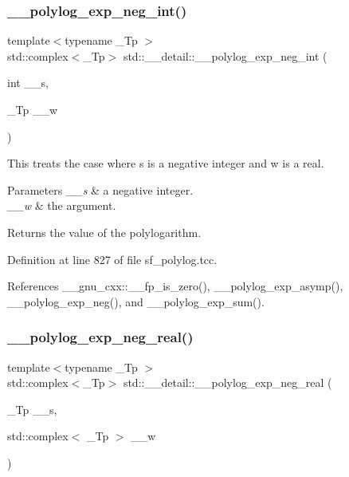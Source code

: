 \subsubsection{\texorpdfstring{\+\_\+\+\_\+polylog\+\_\+exp\+\_\+neg\+\_\+int()}{\_\_polylog\_exp\_neg\_int()}\hspace{0.1cm}{\footnotesize\ttfamily [2/2]}}
{\footnotesize\ttfamily template$<$typename \+\_\+\+Tp $>$ \\
std\+::complex$<$\+\_\+\+Tp$>$ std\+::\+\_\+\+\_\+detail\+::\+\_\+\+\_\+polylog\+\_\+exp\+\_\+neg\+\_\+int (\begin{DoxyParamCaption}\item[{int}]{\+\_\+\+\_\+s,  }\item[{\+\_\+\+Tp}]{\+\_\+\+\_\+w }\end{DoxyParamCaption})}

This treats the case where s is a negative integer and w is a real.


\begin{DoxyParams}{Parameters}
{\em \+\_\+\+\_\+s} & a negative integer. \\
\hline
{\em \+\_\+\+\_\+w} & the argument. \\
\hline
\end{DoxyParams}
\begin{DoxyReturn}{Returns}
the value of the polylogarithm. 
\end{DoxyReturn}


Definition at line 827 of file sf\+\_\+polylog.\+tcc.



References \+\_\+\+\_\+gnu\+\_\+cxx\+::\+\_\+\+\_\+fp\+\_\+is\+\_\+zero(), \+\_\+\+\_\+polylog\+\_\+exp\+\_\+asymp(), \+\_\+\+\_\+polylog\+\_\+exp\+\_\+neg(), and \+\_\+\+\_\+polylog\+\_\+exp\+\_\+sum().

\mbox{\label{namespacestd_1_1____detail_a6320926219e1a9a653d9a793c7a3ad37}} 
\subsubsection{\texorpdfstring{\+\_\+\+\_\+polylog\+\_\+exp\+\_\+neg\+\_\+real()}{\_\_polylog\_exp\_neg\_real()}\hspace{0.1cm}{\footnotesize\ttfamily [1/2]}}
{\footnotesize\ttfamily template$<$typename \+\_\+\+Tp $>$ \\
std\+::complex$<$\+\_\+\+Tp$>$ std\+::\+\_\+\+\_\+detail\+::\+\_\+\+\_\+polylog\+\_\+exp\+\_\+neg\+\_\+real (\begin{DoxyParamCaption}\item[{\+\_\+\+Tp}]{\+\_\+\+\_\+s,  }\item[{std\+::complex$<$ \+\_\+\+Tp $>$}]{\+\_\+\+\_\+w }\end{DoxyParamCaption})}

